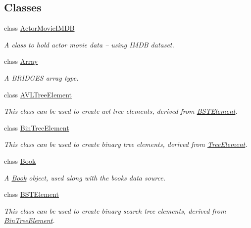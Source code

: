 \subsection*{Classes}
\begin{DoxyCompactItemize}
\item 
class \hyperlink{classbridges_1_1_actor_movie_i_m_d_b}{Actor\+Movie\+I\+M\+D\+B}
\begin{DoxyCompactList}\small\item\em A class to hold actor movie data -- using I\+M\+D\+B dataset. \end{DoxyCompactList}\item 
class \hyperlink{classbridges_1_1_array}{Array}
\begin{DoxyCompactList}\small\item\em A B\+R\+I\+D\+G\+E\+S array type. \end{DoxyCompactList}\item 
class \hyperlink{classbridges_1_1_a_v_l_tree_element}{A\+V\+L\+Tree\+Element}
\begin{DoxyCompactList}\small\item\em This class can be used to create avl tree elements, derived from \hyperlink{classbridges_1_1_b_s_t_element}{B\+S\+T\+Element}. \end{DoxyCompactList}\item 
class \hyperlink{classbridges_1_1_bin_tree_element}{Bin\+Tree\+Element}
\begin{DoxyCompactList}\small\item\em This class can be used to create binary tree elements, derived from \hyperlink{classbridges_1_1_tree_element}{Tree\+Element}. \end{DoxyCompactList}\item 
class \hyperlink{classbridges_1_1_book}{Book}
\begin{DoxyCompactList}\small\item\em A \hyperlink{classbridges_1_1_book}{Book} object, used along with the books data source. \end{DoxyCompactList}\item 
class \hyperlink{classbridges_1_1_b_s_t_element}{B\+S\+T\+Element}
\begin{DoxyCompactList}\small\item\em This class can be used to create binary search tree elements, derived from \hyperlink{classbridges_1_1_bin_tree_element}{Bin\+Tree\+Element}. \end{DoxyCompactList}\item 

\end{DoxyCompactItemize}
